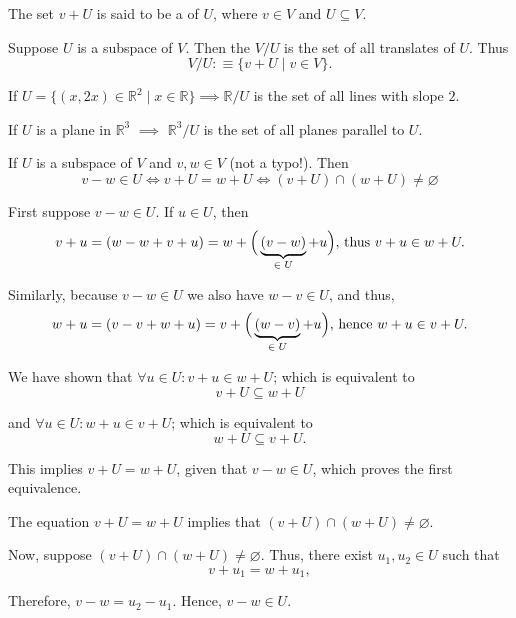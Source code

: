 \setcounter{thm}{96}
\begin{mydef} [translate]
  The set $v+U$ is said to be a  of $U$, where $v\in V$ and $U \subseteq V$.
\end{mydef}

\setcounter{thm}{98}
\begin{mydef} 
  Suppose $U$ is a subspace of $V$. Then the  $V/U$ is the set of all translates of $U$. Thus
  \begin{equation}
    V/U :\equiv \{v+U \mid v\in V\}.
  \end{equation}
\end{mydef}

\begin{example}
  If $U=\{ (x,2x)\in \mathbb{R}^2 \mid x\in \mathbb{R} \} \implies \mathbb{R}/U$ is the set of all lines with slope $2$.

  If $U$ is a plane in $\mathbb{R}^3$ $\implies$ $\mathbb{R}^3/U$ is the set of all planes parallel to $U$.
\end{example}

\begin{thm} 
  \label{thm: two translates of a subspace are equal or disjoint}
  If $ U $ is a subspace of $V$ and $v,w\in V$ (not a typo!). Then
  \begin{equation}
    v-w \in U \iff v+U = w + U \iff (v+U)\cap (w+U) \neq \varnothing
  \end{equation}
\end{thm}
\begin{prf}
  \StepOne First suppose $v-w\in U$. If $u \in U$, then
  \[
    v+u = (w - w + v + u) = w + \Big( \underbrace{(v-w)}_{\in \; U} + u\Big), $ thus $ v+u \in w+U.
  \]

  Similarly, because $v-w \in U$ we also have $w-v \in U$, and thus,
  \[
    w+u = (v - v + w + u) = v+\Big( \underbrace{(w-v)}_{\in \; U}+u \Big), $ hence $ w+u \in v+U.
  \]

  We have shown that $\forall u \in U: v+u \in w+U$; which is equivalent to \[ v+U \subseteq w + U\]

  and $\forall u \in U: w+u \in v+U$; which is equivalent to \[ w+U \subseteq v+U.\]

  This implies $v+U = w+U$, given that $v-w \in U$, which proves the first equivalence.

  \StepTwo The equation $v+U = w+U$ implies that $(v+U) \cap (w+U) \neq \varnothing$.

  \StepThree Now, suppose $(v+U) \cap (w+U) \neq \varnothing$. Thus, there exist $u_1, u_2 \in U$ such that
  \[
    v+u_1 = w+u_1,
  \]

  Therefore, $ v-w = u_2-u_1$. Hence, $v-w \in U$.
\end{prf}

